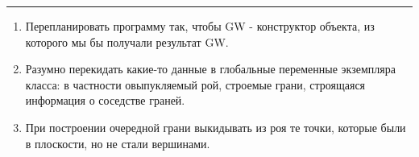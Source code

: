 \documentclass[a4paper,12pt]{article}
\renewcommand{\.}{\hspace{0.2ex}}
\begin{document}
  \hrule

  \bigskip

  \begin{enumerate}
    \item Перепланировать программу так, чтобы GW - конструктор объекта, из которого мы бы получали результат GW.

    \item Разумно перекидать какие-то данные в глобальные переменные экземпляра класса: в частности овыпукляемый рой, строемые грани, строящаяся информация о соседстве граней.

    \item При построении очередной грани выкидывать из роя те точки, которые были в плоскости, но не стали вершинами.
  \end{enumerate}
\end{document}

